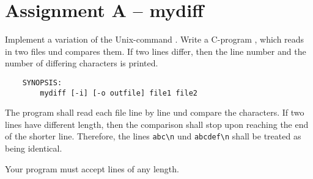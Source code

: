 




\section*{Assignment A -- mydiff}

Implement a variation of the Unix-command .
Write a C-program ,
which reads in two files und compares them.
If two lines differ, then the line number
and the number of differing characters is printed.

\begin{verbatim}
    SYNOPSIS:
        mydiff [-i] [-o outfile] file1 file2
\end{verbatim}

The program shall read each file line by line
und compare the characters.
If two lines have different length,
then the comparison shall stop upon reaching the end of the shorter line.
Therefore, the lines \verb+abc\n+ und \verb+abcdef\n+
shall be treated as being identical.

Your program must accept lines of any length.


